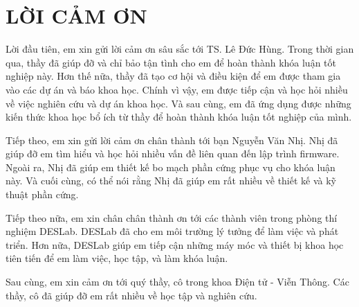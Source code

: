 \chapter*{LỜI CẢM ƠN}
\label{thanks}

Lời đầu tiên, em xin gửi lời cảm ơn sâu sắc tới TS. Lê Đức Hùng. Trong thời gian qua, thầy đã giúp đỡ và chỉ bảo tận tình cho em để hoàn thành khóa luận tốt nghiệp này. Hơn thế nữa, thầy đã tạo cơ hội và điều kiện để em được tham gia vào các dự án và báo khoa học. Chính vì vậy, em được tiếp cận và học hỏi nhiều về việc nghiên cứu và dự án khoa học. Và sau cùng, em đã ứng dụng được những kiến thức khoa học bổ ích từ thầy để hoàn thành khóa luận tốt nghiệp của mình.

Tiếp theo, em xin gửi lời cảm ơn chân thành tới bạn Nguyễn Văn Nhị. Nhị đã giúp đỡ em tìm hiểu và học hỏi nhiều vấn đề liên quan đến lập trình firmware. Ngoài ra, Nhị đã giúp em thiết kế bo mạch phần cứng phục vụ cho khóa luận này. Và cuối cùng, có thể nói rằng Nhị đã giúp em rất nhiều về thiết kế và kỹ thuật phần cứng.

Tiếp theo nữa, em xin chân chân thành ơn tới các thành viên trong phòng thí nghiệm DESLab. DESLab đã cho em môi trường lý tưởng để làm việc và phát triển. Hơn nữa, DESLab giúp em tiếp cận những máy móc và thiết bị khoa học tiên tiến để em làm việc, học tập, và làm khóa luận.

Sau cùng, em xin cảm ơn tới quý thầy, cô trong khoa Điện tử - Viễn Thông. Các thầy, cô đã giúp đỡ em rất nhiều về học tập và nghiên cứu.